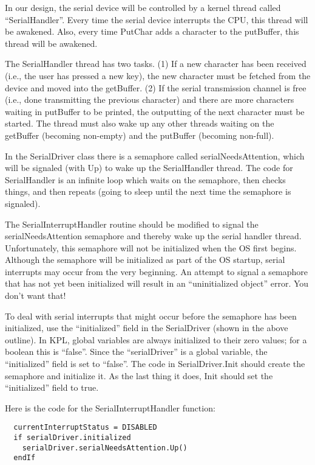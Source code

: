 \documentclass[11pt]{article}
\begin{document}
In our design, the serial device will be controlled by a kernel thread
called ``SerialHandler''.  Every time the serial device interrupts the
CPU, this thread will be awakened.  Also, every time PutChar adds a
character to the putBuffer, this thread will be awakened.

The SerialHandler thread has two tasks.  (1) If a new character has
been received (i.e., the user has pressed a new key), the new
character must be fetched from the device and moved into the
getBuffer.  (2) If the serial transmission channel is free (i.e., done
transmitting the previous character) and there are more characters
waiting in putBuffer to be printed, the outputting of the next
character must be started.  The thread must also wake up any other
threads waiting on the getBuffer (becoming non-empty) and the
putBuffer (becoming non-full).

In the SerialDriver class there is a semaphore called
serialNeedsAttention, which will be signaled (with Up) to wake up the
SerialHandler thread.  The code for SerialHandler is an infinite loop
which waits on the semaphore, then checks things, and then repeats
(going to sleep until the next time the semaphore is signaled).

The SerialInterruptHandler routine should be modified to signal the
serialNeedsAttention semaphore and thereby wake up the serial handler
thread.  Unfortunately, this semaphore will not be initialized when
the OS first begins.  Although the semaphore will be initialized as
part of the OS startup, serial interrupts may occur from the very
beginning.  An attempt to signal a semaphore that has not yet been
initialized will result in an ``uninitialized object'' error.  You don't
want that!

To deal with serial interrupts that might occur before the semaphore
has been initialized, use the ``initialized'' field in the SerialDriver
(shown in the above outline).  In KPL, global variables are always
initialized to their zero values; for a boolean this is ``false''.
Since the ``serialDriver'' is a global variable, the ``initialized'' field
is set to ``false''.  The code in SerialDriver.Init should create the
semaphore and initialize it.  As the last thing it does, Init should
set the ``initialized'' field to true.

Here is the code for the SerialInterruptHandler function:

\begin{verbatim}
  currentInterruptStatus = DISABLED
  if serialDriver.initialized  
    serialDriver.serialNeedsAttention.Up()
  endIf
\end{verbatim}
\end{document}
